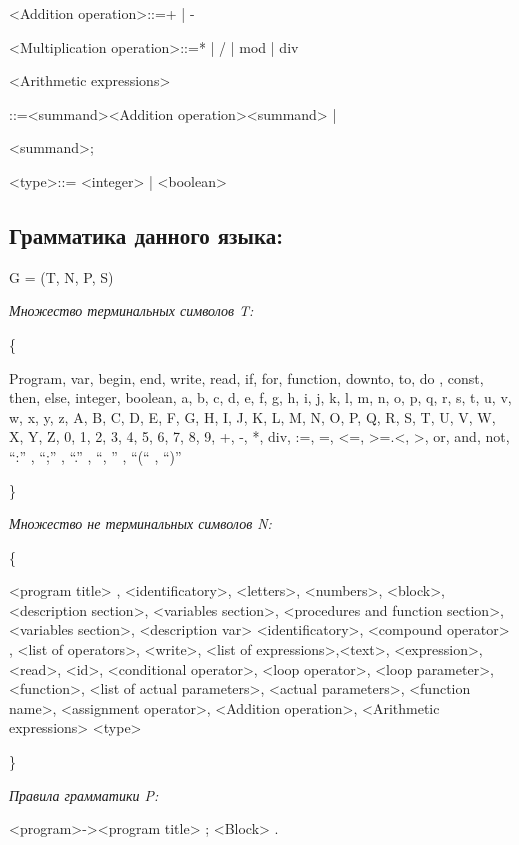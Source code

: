 \documentclass[12pt]{article}
\begin{document}
<Addition operation>::=+  | - 

<Multiplication operation>::=*  | /  | mod  | div 


<Arithmetic expressions> 

\qquad  ::=<summand><Addition operation><summand> | 

      \qquad{} <summand>;


<type>::= <integer>  | <boolean> \\

\begin{center}
    \chapter{\textbf{Грамматика данного языка:}}    
\end{center}

G = (T, N, P, S)

\textit{\large{Множество терминальных символов T: }}

\{

Program,   var,   begin,   end,   write,   read,   if,   for,   function,   downto,   to,   do ,    const,   then,   else,   integer,   boolean,   a,  b,  c,  d,  e,  f,  g,  h,  i,  j,  k,  l,  m,  n,  o,  p,  q,  r,  s,  t,  u,  v,  w,  x,  y,  z,  A,  B,  C,  D,  E,  F,  G,  H,  I,  J,  K,  L,  M,  N,  O,  P,  Q,  R,  S,  T,  U,  V,  W,  X,  Y,  Z,  0,  1,  2,  3,  4,  5,  6,  7,  8,  9,  +,  -,  *,  div,  :=,  =,  <=, >=.<, >,  or,  and,  not,   “:” ,    “;” ,    “.” ,    “,  ” ,    “(“ ,    “)” 

\}

\textit{\large{Множество не терминальных символов N:}}

\{

<program title> , <identificatory>, <letters>, <numbers>, <block>,  <description section>, <variables section>, <procedures and function section>, <variables section>, <description var> <identificatory>, <compound operator> , <list of operators>, <write>,  <list of expressions>,<text>, <expression>, <read>, <id>, <conditional operator>, <loop operator>, <loop parameter>, <function>, <list of actual parameters>, <actual parameters>, <function name>,  <assignment operator>,  <Addition operation>, <Arithmetic expressions> <type>

\}

\textit{\large{Правила грамматики P:}}

<program>-><program title> ; <Block> .
\end{document}
